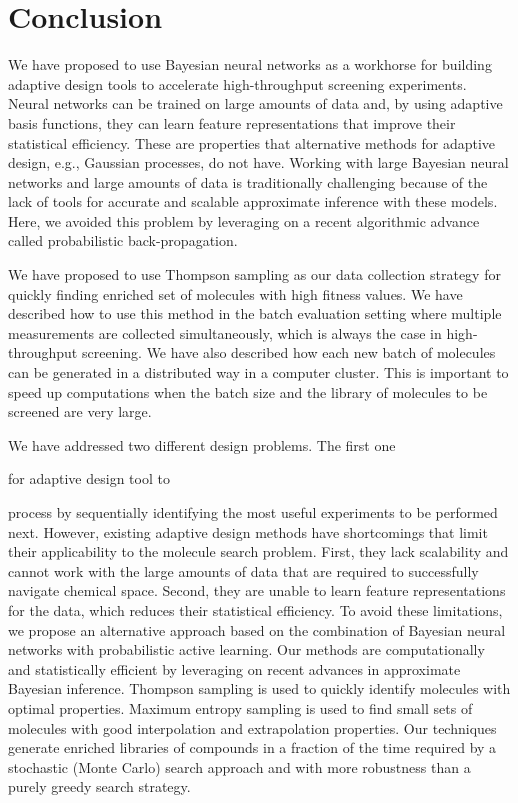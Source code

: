 \section{Conclusion}

We have proposed to use Bayesian neural networks as a workhorse for building adaptive design tools to accelerate high-throughput screening experiments. Neural networks can be trained on large amounts of data and, by using adaptive basis functions, they can learn feature representations that improve their statistical efficiency. These are properties that alternative methods for adaptive design, e.g., Gaussian processes, do not have. Working with large Bayesian neural networks and large amounts of data is traditionally challenging because of the lack of tools for accurate and scalable approximate inference with these models. Here, we avoided this problem by leveraging on a recent algorithmic advance called probabilistic back-propagation.

We have proposed to use Thompson sampling as our data collection strategy for quickly finding enriched set of molecules with high fitness values. We have described how to use this method in the batch evaluation setting where multiple measurements are collected simultaneously, which is always the case in high-throughput screening. We have also described how each new batch of molecules can be generated in a distributed way in a computer cluster. This is important to speed up computations when the batch size and the library of molecules to be screened are very large. 

We have addressed two different design problems. The first one

for adaptive design tool to


process by sequentially identifying the most useful experiments to be performed
next. However, existing adaptive design methods have shortcomings that limit
their applicability to the molecule search problem. First, they lack
scalability and cannot work with the large amounts of data that are required to
successfully navigate chemical space. Second, they are unable to learn feature
representations for the data, which reduces their statistical efficiency. To
avoid these limitations, we propose an alternative approach based on the
combination of Bayesian neural networks with probabilistic active learning. Our
methods are computationally and statistically efficient by leveraging on recent
advances in approximate Bayesian inference. Thompson
sampling is used to quickly identify molecules with optimal properties.
Maximum entropy sampling is used
to find small sets of molecules with good interpolation and extrapolation properties.
Our techniques generate enriched libraries of compounds in a fraction
of the time required by a stochastic (Monte Carlo) search approach and with
more robustness than a purely greedy search strategy.


